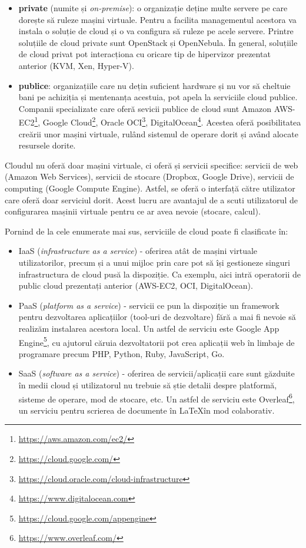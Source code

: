 \begin{itemize}
  \item \textbf{private} (numite și \textit{on-premise}): o organizație deține multe servere pe care dorește să
    ruleze mașini virtuale. Pentru a facilita managementul acestora
    va instala o soluție de cloud și o va configura să ruleze pe
    acele servere. Printre soluțiile de cloud private sunt OpenStack și OpenNebula. În
    general, soluțiile de cloud privat pot interacționa cu oricare
    tip de hipervizor prezentat anterior (KVM, Xen, Hyper-V).
  \item \textbf{publice}: organizațiile care nu dețin suficient hardware și nu vor
    să cheltuie bani pe achiziția și mentenanța acestuia,
    pot apela la serviciile cloud publice. Companii specializate
                care oferă sevicii publice de cloud sunt Amazon AWS-EC2\footnote{\url{https://aws.amazon.com/ec2/}}, Google
                Cloud\footnote{\url{https://cloud.google.com/}}, Oracle
    OCI\footnote{\url{https://cloud.oracle.com/cloud-infrastructure}},
    DigitalOcean\footnote{\url{https://www.digitalocean.com}}.
    Acestea oferă posibilitatea creării unor mașini virtuale, rulând
    sistemul de operare dorit și având alocate resursele dorite.
\end{itemize}

Cloudul nu oferă doar mașini virtuale, ci oferă și servicii specifice: servicii
de web (Amazon Web Services), servicii de stocare (Dropbox, Google Drive),
servicii de computing (Google Compute Engine). Astfel, se oferă o interfață
către utilizator care oferă doar serviciul dorit. Acest lucru are avantajul de a
scuti utilizatorul de configurarea mașinii virtuale pentru ce ar avea
nevoie (stocare, calcul).

Pornind de la cele enumerate mai sus, serviciile de cloud poate fi clasificate în:

\begin{itemize}
  \item IaaS (\textit{infrastructure as a service}) - oferirea atât de mașini
    virtuale utilizatorilor, precum și a unui mijloc prin care pot
    să își gestioneze singuri infrastructura de cloud pusă la
    dispoziție. Ca exemplu, aici intră operatorii de public cloud
    prezentați anterior (AWS-EC2, OCI, DigitalOcean).
  \item PaaS (\textit{platform as a service}) - servicii ce pun la dispoziție un
    framework pentru dezvoltarea aplicațiilor (tool-uri de
    dezvoltare) fără a mai fi nevoie să realizăm instalarea acestora
                local. Un astfel de serviciu este Google App Engine\footnote{\url{https://cloud.google.com/appengine}}, cu ajutorul căruia dezvoltatorii pot crea aplicații web în limbaje de programare precum PHP, Python, Ruby, JavaScript, Go.
  \item SaaS (\textit{software as a service}) - oferirea de servicii/aplicații care
    sunt găzduite în medii cloud și utilizatorul nu trebuie să știe
    detalii despre platformă, sisteme de operare, mod de stocare,
                etc. Un astfel de serviciu este Overleaf\footnote{\url{https://www.overleaf.com/}}, un serviciu pentru scrierea de documente în \LaTeX  în mod colaborativ.
\end{itemize}

